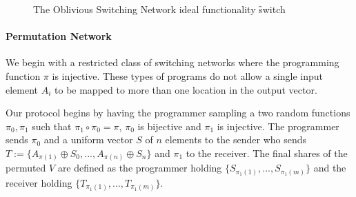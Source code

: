 \begin{figure}[ht]
	\caption{The Oblivious Switching Network ideal functionality \f{switch}}
	\label{fig:perm-ideal}	
\end{figure}


\paragraph{Permutation Network}

We begin with a restricted class of switching networks where the programming function $\pi$ is injective. These types of programs do not allow a single input element $A_i$ to be mapped to more than one location in the output vector. 

Our protocol begins by having the programmer sampling a two random functions $\pi_0,\pi_1$ such that $\pi_1 \circ \pi_0 = \pi$, $\pi_0$ is bijective and $\pi_1$ is injective. The programmer sends $\pi_0$ and a uniform vector $S$ of $n$ elements to the sender who sends $T := \{A_{\pi(1)} \oplus S_0, ...,A_{\pi(n)} \oplus S_n \}$ and  $\pi_1$ to the receiver. The final shares of the permuted $V$ are defined as the programmer holding $\{S_{\pi_1(1)}, ..., S_{\pi_1(m)}\}$ and the receiver holding $\{T_{\pi_1(1)}, ..., T_{\pi_1(m)}\}$.



